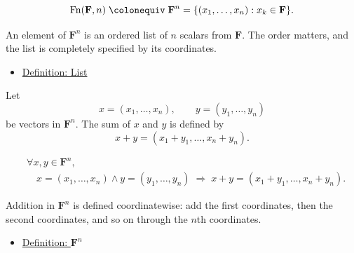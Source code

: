 \begin{remark*}
\[
\operatorname{Fn}(\mathbf{F},n)
\;\colonequiv\;
\mathbf{F}^n = \{(x_1,\ldots,x_n) : x_k \in \mathbf{F}\}.
\]
\end{remark*}

\begin{remark*}[Interpretation]
An element of $\mathbf{F}^n$ is an ordered list of $n$ scalars from $\mathbf{F}$.
The order matters, and the list is completely specified by its coordinates.
\end{remark*}

\begin{remark*}[Dependencies]
\begin{itemize} 
  \item \hyperref[def:list]{Definition: List}
\end{itemize}
\end{remark*}


\begin{tcolorbox}[colback=defbox, colframe=defborder, arc=2pt,
  left=6pt, right=6pt, top=4pt, bottom=4pt,
  title={\small\textbf{Definition (Addition in $\mathbf{F}^n$)}},
  fonttitle=\small\bfseries]
\begin{definition}
\label{def:addition-in-Fn}
Let
\[
x=(x_1,\dots,x_n), \qquad y=(y_1,\dots,y_n)
\]
be vectors in $\mathbf{F}^n$.
The sum of $x$ and $y$ is defined by
\[
x+y
=
(x_1+y_1,\dots,x_n+y_n).
\]
\end{definition}
\end{tcolorbox}

\begin{remark*}
\[
\begin{aligned}
&\forall x,y \in \mathbf{F}^n, \\
&\quad
x=(x_1,\dots,x_n)\land y=(y_1,\dots,y_n)
\;\Rightarrow\;
x+y=(x_1+y_1,\dots,x_n+y_n).
\end{aligned}
\]
\end{remark*}

\begin{remark*}[Interpretation]
Addition in $\mathbf{F}^n$ is defined coordinatewise: add the first coordinates,
then the second coordinates, and so on through the $n$th coordinates.
\end{remark*}

\begin{remark*}[Dependencies]
\begin{itemize}
  \item \hyperref[def:Fn]{Definition: $\mathbf{F}^n$}
\end{itemize}
\end{remark*}

